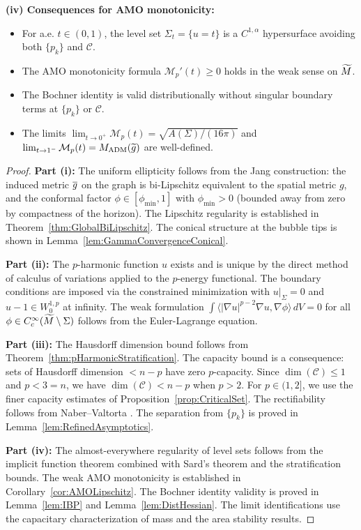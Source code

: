 \begin{theorem}
\textbf{(iv) Consequences for AMO monotonicity:}
\begin{itemize}
    \item For a.e. $t \in (0,1)$, the level set $\Sigma_t = \{u = t\}$ is a $C^{1,\alpha}$ hypersurface avoiding both $\{p_k\}$ and $\mathcal{C}$.
    \item The AMO monotonicity formula $\mathcal{M}_p'(t) \ge 0$ holds in the weak sense on $\widetilde{M}$.
    \item The Bochner identity is valid distributionally without singular boundary terms at $\{p_k\}$ or $\mathcal{C}$.
    \item The limits $\lim_{t \to 0^+} \mathcal{M}_p(t) = \sqrt{A(\Sigma)/(16\pi)}$ and $\lim_{t \to 1^-} \mathcal{M}_p(t) = M_{\mathrm{ADM}}(\widetilde{g})$ are well-defined.
\end{itemize}
\end{theorem}

\begin{proof}
\textbf{Part (i):} The uniform ellipticity follows from the Jang construction: the induced metric $\overline{g}$ on the graph is bi-Lipschitz equivalent to the spatial metric $g$, and the conformal factor $\phi \in [\phi_{\min}, 1]$ with $\phi_{\min} > 0$ (bounded away from zero by compactness of the horizon). The Lipschitz regularity is established in Theorem~\ref{thm:GlobalBiLipschitz}. The conical structure at the bubble tips is shown in Lemma~\ref{lem:GammaConvergenceConical}.

\textbf{Part (ii):} The $p$-harmonic function $u$ exists and is unique by the direct method of calculus of variations applied to the $p$-energy functional. The boundary conditions are imposed via the constrained minimization with $u|_\Sigma = 0$ and $u - 1 \in W^{1,p}_0$ at infinity. The weak formulation $\int \langle |\nabla u|^{p-2} \nabla u, \nabla \phi \rangle \, dV = 0$ for all $\phi \in C^\infty_c(\widetilde{M} \setminus \Sigma)$ follows from the Euler-Lagrange equation.

\textbf{Part (iii):} The Hausdorff dimension bound follows from Theorem~\ref{thm:pHarmonicStratification}. The capacity bound is a consequence: sets of Hausdorff dimension $< n - p$ have zero $p$-capacity. Since $\dim(\mathcal{C}) \le 1$ and $p < 3 = n$, we have $\dim(\mathcal{C}) < n - p$ when $p > 2$. For $p \in (1, 2]$, we use the finer capacity estimates of Proposition~\ref{prop:CriticalSet}. The rectifiability follows from Naber--Valtorta \cite{nabervaltorta2017}. The separation from $\{p_k\}$ is proved in Lemma~\ref{lem:RefinedAsymptotics}.

\textbf{Part (iv):} The almost-everywhere regularity of level sets follows from the implicit function theorem combined with Sard's theorem and the stratification bounds. The weak AMO monotonicity is established in Corollary~\ref{cor:AMOLipschitz}. The Bochner identity validity is proved in Lemma~\ref{lem:IBP} and Lemma~\ref{lem:DistHessian}. The limit identifications use the capacitary characterization of mass and the area stability results.
\end{proof}

